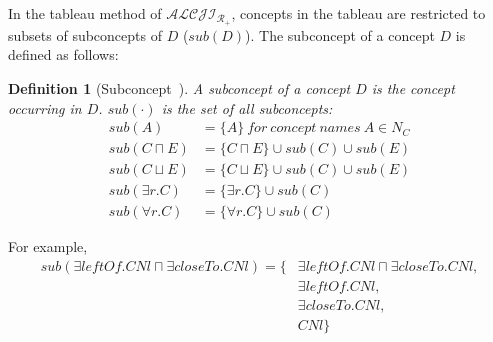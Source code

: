 \documentclass{article}
\newtheorem{mydef}{Definition}
\begin{document}
In the tableau method of $\mathcal{ALCJI_{R_+}}$, concepts in the tableau are restricted to subsets of subconcepts of $D$ ($sub(D)$). The subconcept of a concept $D$ is defined as
follows:
\begin{mydef}[Subconcept~\cite{horrocks1999description}]
 A subconcept of a concept $D$ is the concept occurring in $D$. $sub(\cdot)$ is the set of all subconcepts:
 \begin{align*}
 sub(A)&=\{A\}~for~concept~names~A\in N_C\\
 sub(C\sqcap E)&=\{C\sqcap E\}\cup sub(C)\cup sub(E)\\
 sub(C\sqcup E)&=\{C\sqcup E\}\cup sub(C)\cup sub(E)\\
 sub(\exists r.C)&=\{\exists r.C\}\cup sub(C)\\
 sub(\forall r.C)&=\{\forall r.C\}\cup sub(C)
 \end{align*}
\end{mydef}

For example, 
 \begin{align*}
 sub(\exists leftOf.CNl \sqcap \exists closeTo.CNl)=\{&\exists leftOf.CNl \sqcap \exists closeTo.CNl,\\
 &\exists leftOf.CNl,\\
 &\exists closeTo.CNl,\\
 &CNl\}
 \end{align*}
 
\end{document}
